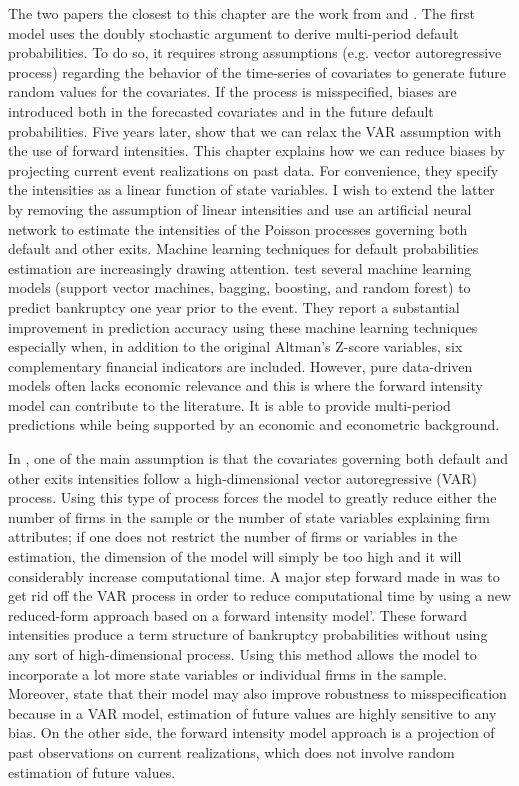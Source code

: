\clearpage
The two papers the closest to this chapter are the work from \citet{DSW} and \citet{Duan2012}. The first model uses the doubly stochastic argument to derive multi-period default probabilities. To do so, it requires strong assumptions (e.g. vector autoregressive process) regarding the behavior of the time-series of covariates to generate future random values for the covariates. If the process is misspecified, biases are introduced both in the forecasted covariates and in the future default probabilities. Five years later, \citet{Duan2012} show that we can relax the VAR assumption with the use of forward intensities. This chapter explains how we can reduce biases by projecting current event realizations on past data. For convenience, they specify the intensities as a linear function of state variables. I wish to extend the latter by removing the assumption of linear intensities and use an artificial neural network to estimate the intensities of the Poisson processes governing both default and other exits. 
Machine learning techniques for default probabilities estimation are increasingly drawing attention. \citet{barboza2017machine} test several machine learning models (support vector machines, bagging, boosting, and random forest) to predict bankruptcy one year prior to the event. They report a substantial improvement in prediction accuracy using these machine learning techniques especially when, in addition to the original Altman’s Z-score variables, six complementary financial indicators are included. However, pure data-driven models often lacks economic relevance and this is where the forward intensity model can contribute to the literature. It is able to provide multi-period predictions while being supported by an economic and econometric background.

In \citet{DSW}, one of the main assumption is that the covariates governing both default and other exits intensities follow a high-dimensional vector autoregressive (VAR) process. Using this type of process forces the model to greatly reduce either the number of firms in the sample or the number of state variables explaining firm attributes; if one does not restrict the number of firms or variables in the estimation, the dimension of the model will simply be too high and it will considerably increase computational time. A major step forward made in \citet{Duan2012} was to get rid off the VAR process in order to reduce computational time by using a new reduced-form approach based on a forward intensity model'. These forward intensities produce a term structure of bankruptcy probabilities without using any sort of high-dimensional process. Using this method allows the model to incorporate a lot more state variables or individual firms in the sample. Moreover, \citet{Duan2012} state that their model may also improve robustness to misspecification because in a VAR model, estimation of future values are highly sensitive to any bias. On the other side, the forward intensity model approach is a projection of past observations on current realizations, which does not involve random estimation of future values. 

